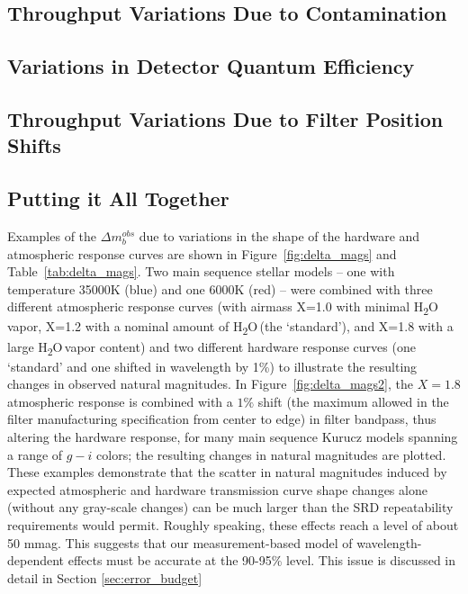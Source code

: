 \documentclass[12pt,preprint]{aastex}
\newcommand{\water}   {H\textsubscript{2}O}
\begin{document}
\subsection{Throughput Variations Due to Contamination}

\subsection{Variations in Detector Quantum Efficiency}

\subsection{Throughput Variations Due to Filter Position Shifts}

\subsection{Putting it All Together}
Examples of the $\Delta m_b^{obs}$ due to variations in the shape of
the hardware and atmospheric response curves are shown in
Figure~\ref{fig:delta_mags} and Table~\ref{tab:delta_mags}. Two main
sequence stellar models \citep{Kurucz1993} -- one with temperature
35000K (blue) and one 6000K (red) -- were combined with three
different atmospheric response curves (with airmass X=1.0 with minimal
\water\, vapor, X=1.2 with a nominal amount of \water\,(the
`standard'), and X=1.8 with a large \water\,vapor content) and two
different hardware response curves (one `standard' and one shifted in
wavelength by 1\%) to illustrate the resulting changes in observed
natural magnitudes. In Figure~\ref{fig:delta_mags2}, the $X=1.8$
atmospheric response is combined with a $1\%$ shift (the maximum
allowed in the filter manufacturing specification from center to edge)
in filter bandpass, thus altering the hardware response, for many main
sequence Kurucz models spanning a range of $g-i$ colors; the resulting
changes in natural magnitudes are plotted.  These examples demonstrate
that the scatter in natural magnitudes induced by expected atmospheric
and hardware transmission curve shape changes alone (without any
gray-scale changes) can be much larger than the SRD repeatability
requirements would permit. Roughly speaking, these effects reach a level of about 
50 mmag.  This suggests that our measurement-based model of wavelength-dependent
effects must be accurate at the 90-95\% level.  This issue is discussed in detail in Section
\ref{sec:error_budget}
\end{document}
